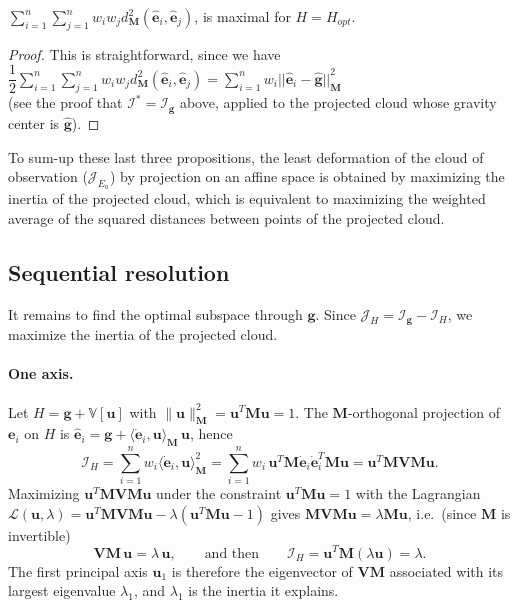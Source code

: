\begin{notechapter}
\begin{prop}
    $\displaystyle\sum\limits_{i=1}^{n}\displaystyle\sum\limits_{j=1}^{n}{w_i}{w_j}d_{\textbf{M}}^2(\hat{\mathbf{e}}_{i}, \hat{\mathbf{e}}_{j})$,
    is maximal for $H = H_{opt}$.
\end{prop}
\begin{proof}
This is straightforward, since we have 
$\dfrac{1}{2} \displaystyle\sum\limits_{i=1}^{n}\displaystyle\sum\limits_{j=1}^{n}{w_i}{w_j}
d_{\textbf{M}}^2(\hat{\mathbf{e}}_{i}, \hat{\mathbf{e}}_{j}) 
= \displaystyle\sum_{i=1}^{n} w_{i} \big| \big| {\hat{\textbf{e}}_i - \hat{\textbf{g}} \big| \big|}_{\mathbf{M}}^2$\\
(see the proof that $\mathcal{I}^{*} = \mathcal{I}_{\mathbf{g}}$ above, applied to the projected cloud whose gravity center is $\hat{\mathbf{g}}$).
\end{proof}
%

To sum-up these last three propositions, the least deformation of the cloud of observation ($\mathcal{J}_{E_{a}}$) by projection 
on an affine space is obtained by maximizing the inertia of the projected cloud, which is equivalent to maximizing
the weighted average of the squared distances between points of the projected cloud. 

\subsection{Sequential resolution}
It remains to find the optimal subspace through $\mathbf{g}$. Since
$\mathcal{J}_{H} = \mathcal{I}_{\mathbf{g}} - \mathcal{I}_{H}$, we maximize the
inertia of the projected cloud.

\paragraph{One axis.}
Let $H = \mathbf{g} + \mathbb{V}[\mathbf{u}]$ with $\|\mathbf{u}\|_{\mathbf{M}}^2 = \mathbf{u}^T\mathbf{M}\mathbf{u} = 1$.
The $\mathbf{M}$-orthogonal projection of $\mathbf{e}_i$ on $H$ is
$\hat{\mathbf{e}}_i = \mathbf{g} + \langle \dot{\mathbf{e}}_i, \mathbf{u} \rangle_{\mathbf{M}}\, \mathbf{u}$, hence
\[
\mathcal{I}_H = \sum_{i=1}^n w_i \langle \dot{\mathbf{e}}_i, \mathbf{u}\rangle_{\mathbf{M}}^2
= \sum_{i=1}^n w_i\, \mathbf{u}^T \mathbf{M} \dot{\mathbf{e}}_i \dot{\mathbf{e}}_i^T \mathbf{M} \mathbf{u}
= \mathbf{u}^T \mathbf{M} \mathbf{V} \mathbf{M} \mathbf{u}.
\]
Maximizing $\mathbf{u}^T \mathbf{M}\mathbf{V}\mathbf{M}\mathbf{u}$ under the constraint
$\mathbf{u}^T\mathbf{M}\mathbf{u} = 1$ with the Lagrangian
$\mathcal{L}(\mathbf{u},\lambda) = \mathbf{u}^T \mathbf{M}\mathbf{V}\mathbf{M}\mathbf{u} - \lambda(\mathbf{u}^T\mathbf{M}\mathbf{u} - 1)$
gives $\mathbf{M}\mathbf{V}\mathbf{M}\mathbf{u} = \lambda \mathbf{M}\mathbf{u}$, i.e.\ (since $\mathbf{M}$ is invertible)
\[
\mathbf{V}\mathbf{M}\,\mathbf{u} = \lambda\, \mathbf{u},
\qquad\text{and then}\qquad \mathcal{I}_H = \mathbf{u}^T\mathbf{M}(\lambda\mathbf{u}) = \lambda .
\]
The first principal axis $\mathbf{u}_1$ is therefore the eigenvector of $\mathbf{V}\mathbf{M}$ associated
with its largest eigenvalue $\lambda_1$, and $\lambda_1$ is the inertia it explains.


\end{notechapter}
